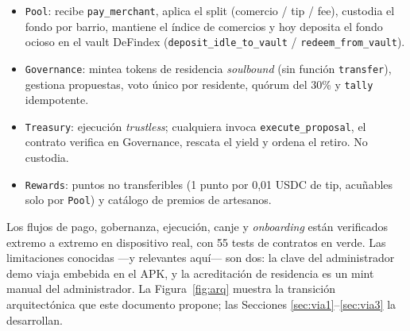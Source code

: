 \documentclass[twocolumn,10pt]{article}
\begin{document}
\begin{itemize}
\item \texttt{Pool}: recibe \texttt{pay\_merchant}, aplica el split (comercio / tip / fee), custodia el fondo por barrio, mantiene el \'indice de comercios y hoy deposita el fondo ocioso en el vault DeFindex (\texttt{deposit\_idle\_to\_vault} / \texttt{redeem\_from\_vault}).
\item \texttt{Governance}: mintea tokens de residencia \emph{soulbound} (sin funci\'on \texttt{transfer}), gestiona propuestas, voto \'unico por residente, qu\'orum del 30\% y \texttt{tally} idempotente.
\item \texttt{Treasury}: ejecuci\'on \emph{trustless}; cualquiera invoca \texttt{execute\_proposal}, el contrato verifica en Governance, rescata el yield y ordena el retiro. No custodia.
\item \texttt{Rewards}: puntos no transferibles (1 punto por 0{,}01 USDC de tip, acu\~nables solo por \texttt{Pool}) y cat\'alogo de premios de artesanos.
\end{itemize}

Los flujos de pago, gobernanza, ejecuci\'on, canje y \emph{onboarding} est\'an verificados extremo a extremo en dispositivo real, con 55 tests de contratos en verde. Las limitaciones conocidas ---y relevantes aqu\'i--- son dos: la clave del administrador demo viaja embebida en el APK, y la acreditaci\'on de residencia es un mint manual del administrador. La Figura~\ref{fig:arq} muestra la transici\'on arquitect\'onica que este documento propone; las Secciones \ref{sec:via1}--\ref{sec:via3} la desarrollan.
\end{document}

